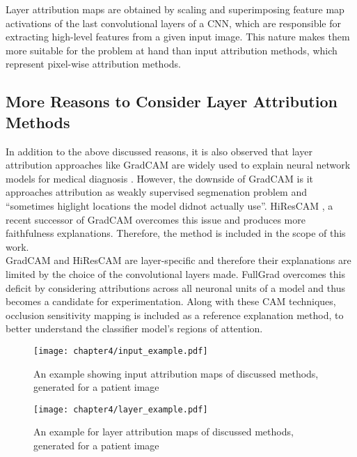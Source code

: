 \documentclass[../report.tex]{subfiles}
\begin{document}
\begin{itemize}
    	Layer attribution maps are obtained by scaling and superimposing feature map activations of the last convolutional layers of a CNN, which are responsible for extracting high-level features from a given input image. This nature makes them more suitable for the problem at hand than input attribution methods, which represent pixel-wise attribution methods.
    \end{itemize}
	
    \subsection{More Reasons to Consider Layer Attribution Methods}
    In addition to the above discussed reasons, it is also observed that layer attribution approaches like GradCAM are widely used to explain neural network models for medical diagnosis \cite{} \cite{} \cite{}. However, the downside of GradCAM is it approaches
    attribution as weakly supervised segmenation problem and \enquote{sometimes higlight locations the model didnot actually use}\cite{draelos2020hirescam}. HiResCAM \cite{draelos2020hirescam}, a recent successor of GradCAM overcomes this issue and produces more faithfulness explanations. Therefore, the method is included in the scope of this work.\\
    GradCAM and HiResCAM are layer-specific and therefore their explanations are limited by the choice of the convolutional layers made. FullGrad \cite{srinivas2019full} overcomes this deficit by considering attributions across all neuronal units of a model and thus becomes a candidate for experimentation. Along with these CAM techniques, occlusion sensitivity mapping is included as a reference explanation method, to better understand the classifier model's regions of attention.
    \begin{figure}[H]
		\hspace*{-2cm}    
    	\texttt{[image: chapter4/input\_example.pdf]}
    	\caption{An example showing input attribution maps of discussed methods, generated for a patient image}
    	\label{example_ipa}
    	 \vspace{1cm}
    	\hspace*{-1.0cm}    
    	\texttt{[image: chapter4/layer\_example.pdf]}
    	\caption{An example for layer attribution maps of discussed methods, generated for a patient image}
    	\label{example_la}
    \end{figure}
\end{document}
